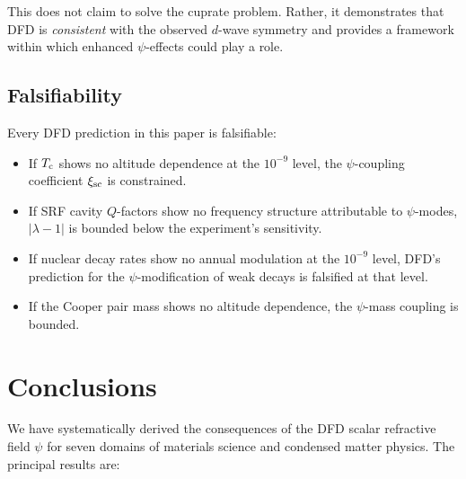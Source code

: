 \documentclass[aps,prb,twocolumn,superscriptaddress,floatfix,nofootinbib,longbibliography]{revtex4-2}
\newcommand{\Tc}{T_{\rm c}}
\begin{document}
This does not claim to solve the cuprate problem.  Rather, it
demonstrates that DFD is \emph{consistent} with the observed $d$-wave
symmetry and provides a framework within which enhanced $\psi$-effects
could play a role.

\subsection{Falsifiability}

Every DFD prediction in this paper is falsifiable:
\begin{itemize}[nosep]
\item If $\Tc$ shows no altitude dependence at the $10^{-9}$ level, the
  $\psi$-coupling coefficient $\xi_{\rm sc}$ is constrained.
\item If SRF cavity $Q$-factors show no frequency structure attributable
  to $\psi$-modes, $|\lambda - 1|$ is bounded below the experiment's
  sensitivity.
\item If nuclear decay rates show no annual modulation at the $10^{-9}$
  level, DFD's prediction for the $\psi$-modification of weak decays is
  falsified at that level.
\item If the Cooper pair mass shows no altitude dependence, the
  $\psi$-mass coupling is bounded.
\end{itemize}

\section{Conclusions}\label{sec:conclusions}

We have systematically derived the consequences of the DFD scalar
refractive field $\psi$ for seven domains of materials science and
condensed matter physics.  The principal results are:
\end{document}
